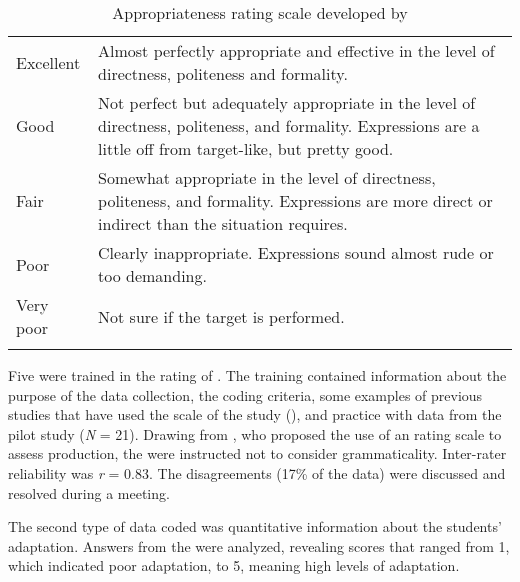 \documentclass[output=paper]{langsci/langscibook}
\begin{document}
\begin{table}
\caption{Appropriateness rating scale developed by \citet[459]{Taguchi2011}}
\label{tab:sanchez:3}

\begin{tabularx}{\textwidth}{lQ}
\lsptoprule 
Excellent & Almost perfectly appropriate and effective in the level of directness, politeness and formality.\\
Good & Not perfect but adequately appropriate in the level of directness, politeness, and formality. Expressions are a little off from target-like, but pretty good.\\
Fair & Somewhat appropriate in the level of directness, politeness, and formality. Expressions are more direct or indirect than the situation requires.\\
Poor & Clearly inappropriate. Expressions sound almost rude or too demanding.\\
Very poor & Not sure if the target  is performed.\\
\lspbottomrule
\end{tabularx}
\end{table}

Five  were trained in the rating of  . The training contained information about the purpose of the data collection, the coding criteria, some examples of previous studies that have used the  scale of the study (\citealt{Taguchi2011,Taguchi2013}), and practice with data from the pilot study (\textit{N} = 21). Drawing from \citet{HudsonEtAl1995}, who proposed the use of an  rating scale to assess  production, the  were instructed not to consider grammaticality. Inter-rater reliability was \textit{r} = 0.83. The disagreements (17\% of the data) were discussed and resolved during a meeting.

The second type of data coded was quantitative information about the students’  adaptation. Answers from the  were analyzed, revealing scores that ranged from 1, which indicated poor  adaptation, to 5, meaning high levels of adaptation. 
\end{document}
